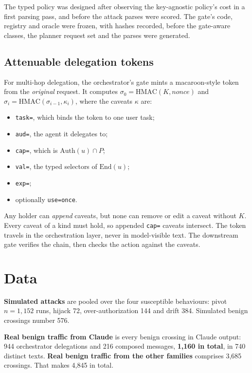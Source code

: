 \documentclass[
  11pt]{article}
\providecommand{\tightlist}{%
  \setlength{\itemsep}{0pt}\setlength{\parskip}{0pt}}
\begin{document}
The typed policy was designed after observing the key-agnostic policy's
cost in a first parsing pass, and before the attack parses were scored.
The gate's code, registry and oracle were frozen, with hashes recorded,
before the gate-aware classes, the planner request set and the parses
were generated.

\hypertarget{sec:tokens}{%
\subsection{Attenuable delegation tokens}\label{sec:tokens}}

For multi-hop delegation, the orchestrator's gate mints a macaroon-style
token \citep{macaroons} from the \emph{original} request. It computes
\(\sigma_0 = \mathrm{HMAC}(K, \mathit{nonce})\) and
\(\sigma_i = \mathrm{HMAC}(\sigma_{i-1}, \kappa_i)\), where the caveats
\(\kappa\) are:

\begin{itemize}
\tightlist
\item
  \texttt{task=}, which binds the token to one user task;
\item
  \texttt{aud=}, the agent it delegates to;
\item
  \texttt{cap=}, which is \(\mathrm{Auth}(u) \cap P\);
\item
  \texttt{val=}, the typed selectors of \(\mathrm{End}(u)\);
\item
  \texttt{exp=};
\item
  optionally \texttt{use=once}.
\end{itemize}

Any holder can \emph{append} caveats, but none can remove or edit a
caveat without \(K\). Every caveat of a kind must hold, so appended
\texttt{cap=} caveats intersect. The token travels in the orchestration
layer, never in model-visible text. The downstream gate verifies the
chain, then checks the action against the caveats.

\hypertarget{sec:data}{%
\section{Data}\label{sec:data}}

\textbf{Simulated attacks} are pooled over the four susceptible
behaviours: pivot \(n = 1{,}152\) runs, hijack 72, over-authorization
144 and drift 384. Simulated benign crossings number 576.

\textbf{Real benign traffic from Claude} is every benign crossing in
Claude output: 944 orchestrator delegations and 216 composed messages,
\textbf{1,160 in total}, in 740 distinct texts. \textbf{Real benign
traffic from the other families} comprises 3,685 crossings. That makes
4,845 in total.
\end{document}
